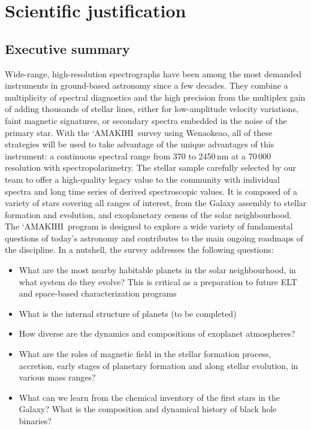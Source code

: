 \documentclass[
    traditabstract,
    longauth,
    onecolumn,
]{aa}
\def \amakihi{`AMAKIHI}
\def \wena{Wenaokeao}
\begin{document}
\section{Scientific justification }
\subsection{Executive summary}

Wide-range, high-resolution spectrographs have been among the most demanded instruments in ground-based astronomy since a few decades. They combine a multiplicity of spectral diagnostics and the high precision from the multiplex gain of adding thousands of stellar lines, either for low-amplitude velocity variations, faint magnetic signatures, or secondary spectra embedded in the noise of the primary star. With the \amakihi\ survey using \wena, all of these strategies will be used to take advantage of the unique advantages of this instrument: a continuous spectral range from 370 to 2450\,nm at a 70\,000 resolution with spectropolarimetry. The stellar sample carefully selected by our team to offer a high-quality legacy value to the community with individual spectra and long time series of derived spectroscopic values. It is composed of a variety of stars covering all ranges of interest, from the Galaxy assembly to stellar formation and evolution, and exoplanetary census of the solar neighbourhood. \\

The \amakihi\ program is designed to explore a wide variety of fundamental questions of today's astronomy and contributes to the main ongoing roadmaps of the discipline. In a nutshell, the survey addresses the following questions:\begin{itemize}
    \item What are the most nearby habitable planets in the solar neighbourhood, in what system do they evolve? This is critical as a preparation to future ELT and space-based characterization programs
    \item What is the internal structure of planets (to be completed)
    \item How diverse are the dynamics and compositions of exoplanet atmospheres?
    \item What are the roles of magnetic field in the stellar formation process, accretion, early stages of planetary formation and along stellar evolution, in various mass ranges?
    \item What can we learn from the chemical inventory of the first stars in the Galaxy? What is the composition and dynamical history of black hole binaries?
\end{itemize}
\end{document}
